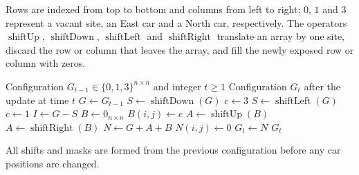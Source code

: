 Rows are indexed from top to bottom and columns from left to right;
$0$, $1$ and $3$ represent a vacant site, an East car and a North car,
respectively. The operators $\operatorname{shiftUp}$,
$\operatorname{shiftDown}$, $\operatorname{shiftLeft}$ and
$\operatorname{shiftRight}$ translate an array by one site, discard the
row or column that leaves the array, and fill the newly exposed row or
column with zeros.

\begingroup
{}
\begin{algorithm}[H]
\caption{One vectorised update of the BML model}
\label{alg:vectorised-bml}
\begin{algorithmic}[1]
\Require Configuration $G_{t-1}\in\{0,1,3\}^{n\times n}$ and integer $t\geq1$
\Ensure Configuration $G_t$ after the update at time $t$
\State $G\gets G_{t-1}$
    \State $S\gets\operatorname{shiftDown}(G)$
    \State $c\gets3$
\Else
    \State $S\gets\operatorname{shiftLeft}(G)$
    \State $c\gets1$
\EndIf
\State $I\gets G-S$
\State $B\gets0_{n\times n}$
        \State $B(i,j)\gets c$
    \EndIf
\EndFor
{}
    \State $A\gets\operatorname{shiftUp}(B)$
\Else
    \State $A\gets\operatorname{shiftRight}(B)$
\EndIf
\State $N\gets G+A+B$
        \State $N(i,j)\gets0$
    \EndIf
\EndFor
\State $G_t\gets N$
\State \Return $G_t$
\end{algorithmic}
\end{algorithm}
\endgroup

All shifts and masks are formed from the previous configuration before
any car positions are changed.



